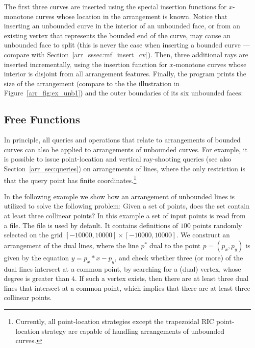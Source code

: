 The first three curves are inserted using the special insertion
functions for $x$-monotone curves whose location in the arrangement
is known. Notice that inserting an unbounded curve in the interior
of an unbounded face, or from an existing vertex that represents the
bounded end of the curve, may cause an unbounded face to split (this
is never the case when inserting a bounded curve --- compare with
Section~\ref{arr_sssec:mf_insert_cv}). Then, three additional rays are 
inserted incrementally, using the insertion function for $x$-monotone
curves whose interior is disjoint from all arrangement features.
Finally, the program prints the size of the arrangement (compare to
the the illustration in Figure~\ref{arr_fig:ex_unb1}) and the outer
boundaries of its six unbounded faces:


\subsection{Free Functions\label{arr_ssec:unb_global}}

In principle, all queries and operations that relate to arrangements
of bounded curves can also be applied to arrangements of unbounded
curves. For example, it is possible to issue point-location and
vertical ray-shooting queries (see also Section~\ref{arr_sec:queries})
on arrangements of lines, where the only restriction is that the query
point has finite coordinates.\footnote{Currently, all point-location
strategies except the trapezoidal RIC point-location strategy are
capable of handling arrangements of unbounded curves.} 

In the following example we show how an arrangement of unbounded lines
is utilized to solve the following problem: Given a set of points, does
the set contain at least three collinear points? In this example a set
of input points is read from a file. The file   is
used by default. It contains definitions of $100$ points randomly
selected on the grid $[-10000,10000]\times[-10000,10000]$. We
construct an arrangement of the dual lines, where the line $p^{*}$
dual to the point $p = (p_x, p_y)$ is given by the equation
$y = p_x*x - p_y$, and check whether three (or more) of the dual lines
intersect at a common point, by searching for a (dual) vertex, whose
degree is greater than $4$. If such a vertex exists, then there are at
least three dual lines that intersect at a common point, which implies
that there are at least three collinear points.

